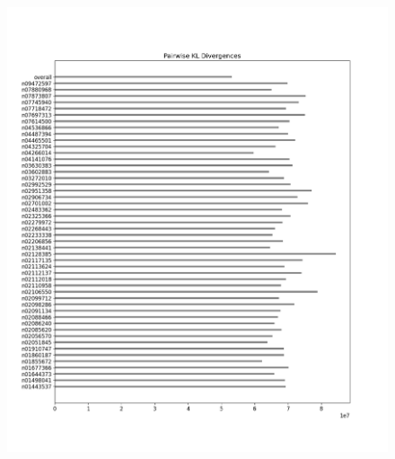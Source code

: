 \documentclass{article}
\begin{document}
\begin{figure}[H]
\begin{minipage}{0.45\textwidth}
            \includegraphics[width=\textwidth]{cross_imagenet_imgr_r_third_last_untrained/alexnet_kl_div_b_to_apairwise.png} %
            

\end{minipage}
\end{figure}
\end{document}
